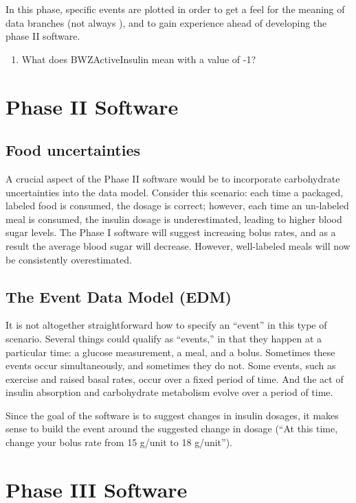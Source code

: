In this phase, specific events are plotted in order to get a feel for the meaning of data branches 
(not always ), and to gain experience ahead of developing the phase II software.

\begin{enumerate}
\item What does BWZActiveInsulin mean with a value of -1?
\end{enumerate}

\section{Phase II Software}

\subsection{Food uncertainties}

A crucial aspect of the Phase II software would be to incorporate carbohydrate  uncertainties into the 
data model. Consider this scenario: each time a packaged, labeled food is consumed, the dosage is 
correct; however, each time an un-labeled meal is consumed, the insulin dosage is underestimated, 
leading to higher blood sugar levels. The Phase I software will suggest increasing bolus rates, and 
as a result the average blood sugar will decrease. However, well-labeled meals will now be 
consistently overestimated.

\subsection{The Event Data Model (EDM)}

It is not altogether straightforward how to specify an ``event'' in this type of scenario. Several 
things could qualify as ``events,'' in that they happen at a particular time: a glucose measurement, 
a meal, and a bolus. Sometimes these events occur simultaneously, and sometimes they do not. Some 
events, such as exercise and raised basal rates, occur over a fixed period of time. And the act of 
insulin absorption and carbohydrate metabolism evolve over a period of time.

Since the goal of the software is to suggest changes in insulin dosages, it makes sense to build the 
event around the suggested change in dosage (``At this time, change your bolus rate from 15 g/unit 
to 18 g/unit''). 

\section{Phase III Software}

